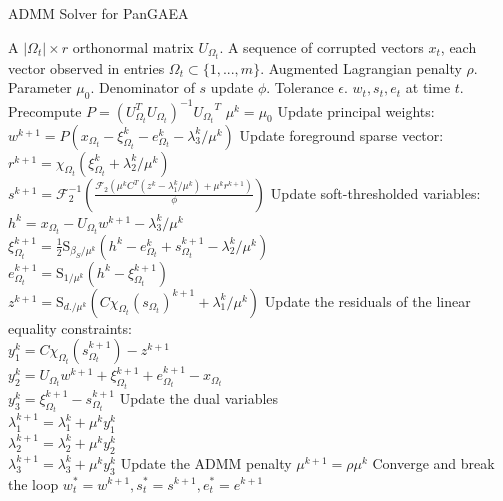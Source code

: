 \documentclass[10pt,twocolumn,letterpaper]{article}
\begin{document}
 \begin{algorithm}
 \caption{ADMM Solver for PanGAEA}
 \begin{algorithmic}[1]
 \renewcommand{\algorithmicrequire}{\textbf{Input:}}
 \renewcommand{\algorithmicensure}{\textbf{Output:}}
 \REQUIRE A $|\Omega_t| \times r$ orthonormal matrix $U_{\Omega_t}$. A sequence of corrupted vectors $x_t$, each vector observed in entries $\Omega_t \subset \{1, . . . , m\}$. Augmented Lagrangian penalty $\rho$. Parameter $\mu_0$. Denominator of $s$ update $\phi$. Tolerance $\epsilon$.
 \ENSURE  $w_t, s_t, e_t$ at time $t$.
 \STATE Precompute $P = (U_{\Omega_t}^TU_{\Omega_t})^{-1}{U_{\Omega_t}}^T$
 \STATE $\mu^k = \mu_0$
   \STATE Update principal weights: \\
   $w^{k+1} = P(x_{\Omega_t} -\xi_{\Omega_t}^k - e_{\Omega_t} ^k- \lambda_{3}^k/\mu^k)$
   \STATE Update foreground sparse vector: \\
   $r^{k+1} = \chi_{\Omega_t}(\xi_{\Omega_t}^k+ \lambda_{2}^k/\mu^k)$\\
    $s^{k+1}= \mathcal{F}^{-1}_2(\frac{\mathcal{F}_2(\mu^k C^T(z^k - \lambda_{1}^k/\mu^k) + \mu^k r^{k+1})}{\phi}) $
   \STATE Update soft-thresholded variables: \\
   $h^{k} = x_{\Omega_t} - U_{\Omega_t}w^{k+1} - \lambda_{3}^k/\mu^k$ \\
    $\xi_{\Omega_t}^{k+1} = \frac{1}{2} \text{S}_{\beta_S/\mu^k}(h^{k} - e_{\Omega_t}^k + s_{\Omega_t}^{k+1} -\lambda_{2}^k/\mu^k)$ \\
    $e_{\Omega_t}^{k+1} = \text{S}_{1/\mu^k}(h^{k} - \xi_{\Omega_t}^{k+1})$ \\
    $z^{k+1} = \text{S}_{d./\mu^k}(C\chi_{\Omega_t}(s_{\Omega_t})^{k+1} + \lambda_{1}^k/\mu^k)$ 
   \STATE Update the residuals of the linear equality constraints: \\
   $y_1^k = C \chi_{\Omega_t}(s_{\Omega_t}^{k+1}) - z^{k+1}$ \\
   $y_2^k = U_{\Omega_t}w^{k+1} + \xi_{\Omega_t}^{k+1} + e_{\Omega_t}^{k+1}  - x_{\Omega_t}$ \\
   $y_3^k = \xi_{\Omega_t}^{k+1} - s_{\Omega_t}^{k+1} $
   \STATE Update the dual variables \\
   	$\lambda_{1}^{k+1} = \lambda_{1}^k + \mu^k y_1^k $ \\
	$\lambda_{2}^{k+1} = \lambda_{2}^k + \mu^k y_2^k $ \\
	$\lambda_{3}^{k+1} = \lambda_{3}^k + \mu^k y_3^k$
\STATE Update the ADMM penalty $\mu^{k+1} = \rho \mu^k$
	\STATE Converge and break the loop
\ENDIF
  \ENDFOR
 \RETURN $w_t^* = w^{k+1}, s_t^* = s^{k+1}, e_t^* = e^{k+1}$
 \end{algorithmic} 
 \label{alg:pangaea_admm}
 \end{algorithm}
\end{document}
